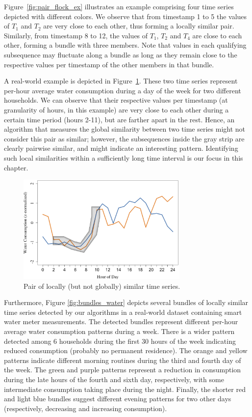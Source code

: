 Figure~\ref{fig:pair_flock_ex} illustrates an example comprising four time series depicted with different colors. We observe that from timestamp 1 to 5 the values of $T_1$ and $T_2$ are very close to each other, thus forming a locally similar pair. Similarly, from timestamp 8 to 12, the values of $T_1$, $T_2$ and $T_4$ are close to each other, forming a bundle with three members. Note that values in each qualifying subsequence may fluctuate along a bundle as long as they remain close to the respective values per timestamp of the other members in that bundle.

A real-world example is depicted in Figure~\ref{fig:water_real_ex}. These two time series represent per-hour average water consumption during a day of the week for two different households. We can observe that their respective values per timestamp (at granularity of hours, in this example) are very close to each other during a certain time period (hours 2-11), but are farther apart in the rest. Hence, an algorithm that measures the global similarity between two time series might not consider this pair as similar; however, the subsequences inside the gray strip are clearly pairwise similar, and might indicate an interesting pattern. Identifying such local similarities within a sufficiently long time interval is our focus in this chapter.

\begin{figure}[!tb]
    \centering
    \includegraphics[width=0.75\textwidth]{figures/water_real_ex.png}
    \caption{Pair of locally (but not globally) similar time series.} 
    \label{fig:water_real_ex}
\end{figure}

Furthermore, Figure \ref{fig:bundles_water} depicts several bundles of locally similar time series detected by our algorithms in a real-world dataset containing smart water meter measurements. The detected bundles represent different per-hour average water consumption patterns during a week. There is a wider pattern detected among 6 households during the first 30 hours of the week indicating reduced consumption (probably no permanent residence). The orange and yellow patterns indicate different morning routines during the third and fourth day of the week. The green and purple patterns represent a reduction in consumption during the late hours of the fourth and sixth day, respectively, with some intermediate consumption taking place during the night. Finally, the shorter red and light blue bundles suggest different evening patterns for two other days (respectively, decreasing and increasing consumption).

